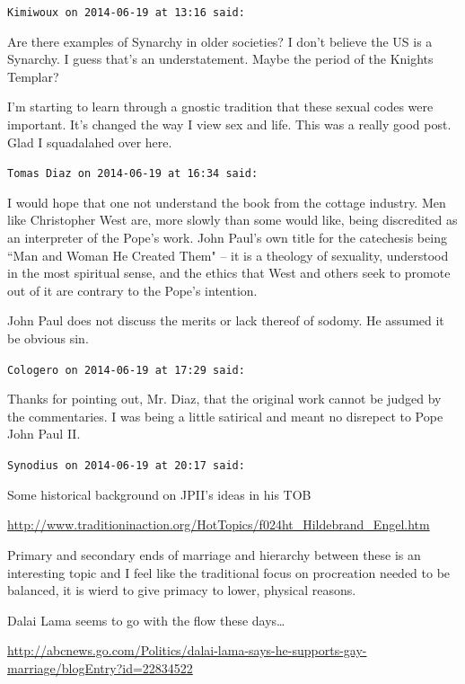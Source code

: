 \begin{footnotesize}\begin{sffamily}



\texttt{Kimiwoux on 2014-06-19 at 13:16 said: }

Are there examples of Synarchy in older societies? I don't believe the US is a Synarchy. I guess that's an understatement. Maybe the period of the Knights Templar?

I'm starting to learn through a gnostic tradition that these sexual codes were important. It's changed the way I view sex and life. This was a really good post. Glad I squadalahed over here.


\hfill

\texttt{Tomas Diaz on 2014-06-19 at 16:34 said: }

I would hope that one not understand the book from the cottage industry. Men like Christopher West are, more slowly than some would like, being discredited as an interpreter of the Pope's work. John Paul's own title for the catechesis being ``Man and Woman He Created Them" – it is a theology of sexuality, understood in the most spiritual sense, and the ethics that West and others seek to promote out of it are contrary to the Pope's intention.

John Paul does not discuss the merits or lack thereof of sodomy. He assumed it be obvious sin.


\hfill

\texttt{Cologero on 2014-06-19 at 17:29 said: }

Thanks for pointing out, Mr. Diaz, that the original work cannot be judged by the commentaries. I was being a little satirical and meant no disrepect to Pope John Paul II.


\hfill

\texttt{Synodius on 2014-06-19 at 20:17 said: }

Some historical background on JPII's ideas in his TOB

\url{http://www.traditioninaction.org/HotTopics/f024ht\_Hildebrand\_Engel.htm}

Primary and secondary ends of marriage and hierarchy between these is an interesting topic and I feel like the traditional focus on procreation needed to be balanced, it is wierd to give primacy to lower, physical reasons.

Dalai Lama seems to go with the flow these days…

\url{http://abcnews.go.com/Politics/dalai-lama-says-he-supports-gay-marriage/blogEntry?id=22834522}



\end{sffamily}
\end{footnotesize}
